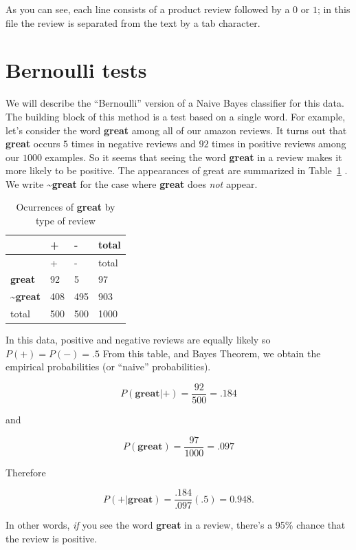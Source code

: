\documentclass[
  11pt,
  letterpaper,
]{scrbook}
\theoremstyle{plain}
\theoremstyle{plain}
\theoremstyle{remark}
\begin{document}
As you can see, each line consists of a product review followed by a
\(0\) or \(1\); in this file the review is separated from the text by a
tab character.

\hypertarget{bernoulli-tests}{%
\section{Bernoulli tests}\label{bernoulli-tests}}

We will describe the ``Bernoulli'' version of a Naive Bayes classifier
for this data. The building block of this method is a test based on a
single word. For example, let's consider the word \textbf{great} among
all of our amazon reviews. It turns out that \textbf{great} occurs \(5\)
times in negative reviews and \(92\) times in positive reviews among our
\(1000\) examples. So it seems that seeing the word \textbf{great} in a
review makes it more likely to be positive. The appearances of great are
summarized in Table~\ref{tbl-great} . We write
\textasciitilde{}\textbf{great} for the case where \textbf{great} does
\emph{not} appear.

\hypertarget{tbl-great}{}
\begin{longtable}[]{@{}llll@{}}
\caption{\label{tbl-great}Ocurrences of \textbf{great} by type of
review}\tabularnewline
\toprule()
& + & - & total \\
\midrule()
\endfirsthead
\toprule()
& + & - & total \\
\midrule()
\endhead
\textbf{great} & 92 & 5 & 97 \\
\textasciitilde{}\textbf{great} & 408 & 495 & 903 \\
total & 500 & 500 & 1000 \\
\bottomrule()
\end{longtable}

In this data, positive and negative reviews are equally likely so
\(P(+)=P(-)=.5\) From this table, and Bayes Theorem, we obtain the
empirical probabilities (or ``naive'' probabilities).

\[
P(\mathbf{great} | +) = \frac{92}{500} = .184
\]

and

\[
P(\mathbf{great}) = \frac{97}{1000} = .097
\]

Therefore

\[
P(+|\mathbf{great}) = \frac{.184}{.097}(.5) = 0.948.
\]

In other words, \emph{if} you see the word \textbf{great} in a review,
there's a 95\% chance that the review is positive.
\end{document}

